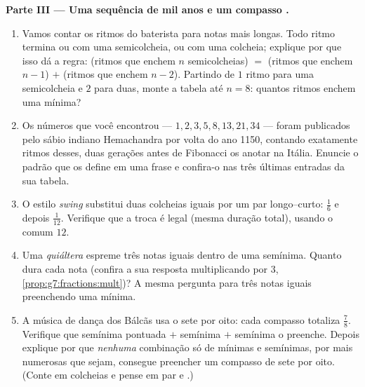 \begin{problem}
\medskip
\noindent\textbf{Parte III --- Uma sequência de mil anos e um compasso
.}
\begin{enumerate}[resume]
  \item Vamos contar os ritmos do baterista para notas mais longas.
        Todo ritmo termina ou com uma semicolcheia, ou com uma
        colcheia; explique por que isso dá a regra: (ritmos que enchem
        $n$ semicolcheias) $=$ (ritmos que enchem $n - 1$) $+$ (ritmos
        que enchem $n - 2$). Partindo de $1$ ritmo para uma
        semicolcheia e $2$ para duas, monte a tabela até $n = 8$:
        quantos ritmos enchem uma mínima?
  \item Os números que você encontrou --- $1, 2, 3, 5, 8, 13, 21, 34$
        --- foram publicados pelo sábio indiano Hemachandra por volta
        do ano 1150, contando exatamente ritmos desses, duas gerações
        antes de Fibonacci os anotar na Itália. Enuncie o padrão que os
        define em uma frase e confira-o nas três últimas entradas da
        sua tabela.
  \item O estilo \emph{swing} substitui duas colcheias iguais por um
        par longo--curto: $\frac16$ e depois $\frac{1}{12}$. Verifique
        que a troca é legal (mesma duração total), usando o 
        comum $12$.
  \item Uma \emph{quiáltera} espreme três notas iguais dentro de uma
        semínima. Quanto dura cada nota (confira a sua resposta
        multiplicando por $3$, \cref{prop:g7:fractions:mult})? A mesma
        pergunta para três notas iguais preenchendo uma mínima.
  \item A música de dança dos Bálcãs usa o sete por oito: cada compasso
        totaliza $\frac78$. Verifique que semínima pontuada $+$ semínima
        $+$ semínima o preenche. Depois explique por que
        \emph{nenhuma} combinação só de mínimas e semínimas, por mais
        numerosas que sejam, consegue preencher um compasso de sete por
        oito. (Conte em colcheias e pense em par e .)
\end{enumerate}
\end{problem}
